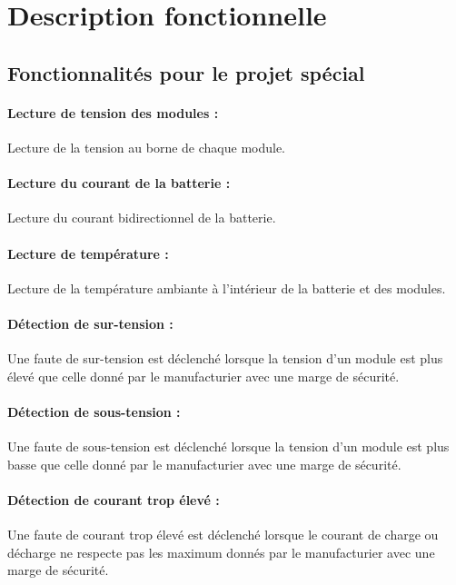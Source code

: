 
\section{Description fonctionnelle}

	\subsection{Fonctionnalités pour le projet spécial}
	
		\paragraph{Lecture de tension des modules :} 
		Lecture de la tension au borne de chaque module.
		
		\paragraph{Lecture du courant de la batterie :}
		Lecture du courant bidirectionnel de la batterie.
		
		\paragraph{Lecture de température :}
		Lecture de la température ambiante à l'intérieur de la batterie et des modules. 
		
		\paragraph{Détection de sur-tension :}
		Une faute de sur-tension est déclenché lorsque la tension d'un module est plus élevé que celle donné par le manufacturier avec une marge de sécurité.  
		
		\paragraph{Détection de sous-tension :}
		Une faute de sous-tension est déclenché lorsque la tension d'un module est plus basse que celle donné par le manufacturier avec une marge de sécurité.
		
		\paragraph{Détection de courant trop élevé :}
		Une faute de courant trop élevé est déclenché lorsque le courant de charge ou décharge ne respecte pas les maximum donnés par le manufacturier avec une marge de sécurité.
		
